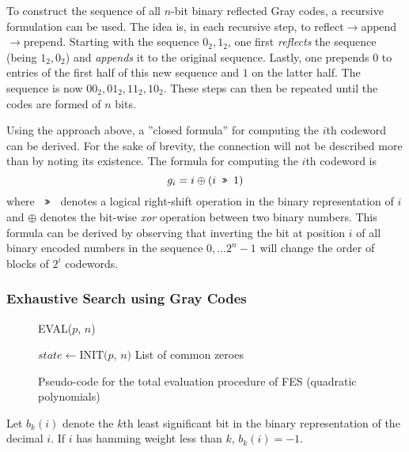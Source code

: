 To construct the sequence of all $n$-bit binary reflected Gray codes, a recursive formulation can be used. The idea is, in each recursive step, to reflect$\rightarrow$append$\rightarrow$prepend. Starting with the sequence $0_2, 1_2$, one first \textit{reflects} the sequence (being $1_2, 0_2$) and \textit{appends} it to the original sequence. Lastly, one prepends $0$ to entries of the first half of this new sequence and $1$ on the latter half. The sequence is now $00_2, 01_2, 11_2, 10_2$. These steps can then be repeated until the codes are formed of $n$ bits.

Using the approach above, a ''closed formula'' for computing the $i$th codeword can be derived. For the sake of brevity, the connection will not be described more than by noting its existence. The formula for computing the $i$th codeword is
$$
    g_i = i \oplus (i \texttt{ >> } 1)
$$
where $\texttt{ >> }$ denotes a logical right-shift operation in the binary representation of $i$ and $\oplus$ denotes the bit-wise \textit{xor} operation between two binary numbers. This formula can be derived by observing that inverting the bit at position $i$ of all binary encoded numbers in the sequence $0,\dots 2^{n} - 1$ will change the order of blocks of $2^i$ codewords.

\subsubsection{Exhaustive Search using Gray Codes} \label{sec:prereq:fes:exh_g_code}
\begin{figure}[t]
    \begin{alg}
        \caption{EVAL($p$, $n$)}\label{alg:fes_eval}
        $state \gets \text{INIT($p$, $n$)}$\;
        \Return List of common zeroes
    \end{alg}
    \caption{Pseudo-code for the total evaluation procedure of FES (quadratic polynomials)}
\end{figure}

\begin{defn}[] \label{sec:prereq:def:bk}
    Let $b_k(i)$ denote the $k$th least significant bit in the binary representation of the decimal $i$. If $i$ has hamming weight less than $k$, $b_k(i) = -1$.
\end{defn}

